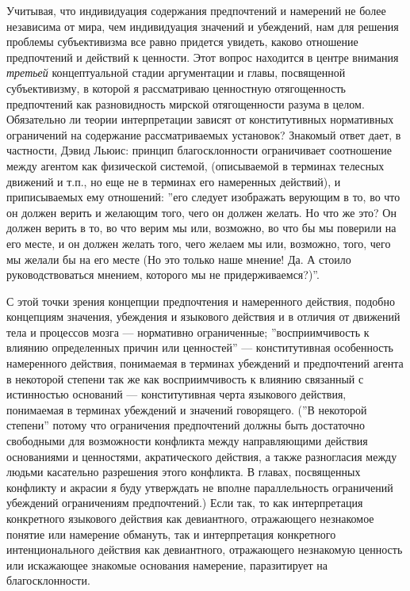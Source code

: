 \documentclass[11pt]{book}
\begin{document}
Учитывая, что индивидуация содержания предпочтений и намерений не более независима от мира, чем индивидуация значений и убеждений, нам для решения проблемы субъективизма все равно придется увидеть, каково отношение предпочтений и действий к ценности. Этот вопрос находится в центре внимания \textit{третьей} концептуальной стадии аргументации и главы, посвященной субъективизму, в которой я рассматриваю ценностную отягощенность предпочтений как разновидность мирской отягощенности разума в целом. Обязательно ли теории интерпретации зависят от конститутивных нормативных ограничений на содержание рассматриваемых установок? Знакомый ответ дает, в частности, Дэвид Льюис: принцип благосклонности ограничивает соотношение между агентом как физической системой, (описываемой в терминах телесных движений и т.п., но еще не в терминах его намеренных действий), и приписываемых ему отношений: ''его следует изображать верующим в то, во что он должен верить и желающим того, чего он должен желать. Но что же это? Он должен верить в то, во что верим мы или, возможно, во что бы мы поверили на его месте, и он должен желать того, чего желаем мы или, возможно, того, чего мы желали бы на его месте (Но это только наше мнение! Да. А стоило руководствоваться мнением, которого мы не придерживаемся?)''.

С этой точки зрения концепции предпочтения и намеренного действия, подобно концепциям значения, убеждения и языкового действия и в отличия от движений тела и процессов мозга --- нормативно ограниченные; ''восприимчивость к влиянию определенных причин или ценностей'' --- конститутивная особенность намеренного действия, понимаемая в терминах убеждений и предпочтений агента в некоторой степени так же как восприимчивость к влиянию связанный с истинностью оснований --- конститутивная черта языкового действия, понимаемая в терминах убеждений и значений говорящего. (''В некоторой степени'' потому что ограничения предпочтений должны быть достаточно свободными для возможности конфликта между направляющими действия основаниями и ценностями, акратического действия, а также разногласия между людьми касательно разрешения этого конфликта. В главах, посвященных конфликту и акрасии я буду утверждать не вполне параллельность ограничений убеждений ограничениям предпочтений.) Если так, то как интерпретация конкретного языкового действия как девиантного, отражающего незнакомое понятие или намерение обмануть, так и интерпретация конкретного интенционального действия как девиантного, отражающего незнакомую ценность или искажающее знакомые основания намерение, паразитирует на благосклонности.
\end{document}
